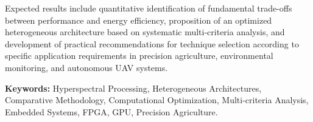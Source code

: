 Expected results include quantitative identification of fundamental trade-offs between performance and energy efficiency, proposition of an optimized heterogeneous architecture based on systematic multi-criteria analysis, and development of practical recommendations for technique selection according to specific application requirements in precision agriculture, environmental monitoring, and autonomous UAV systems.

\textbf{Keywords:} 
Hyperspectral Processing, Heterogeneous Architectures, Comparative Methodology, Computational Optimization, Multi-criteria Analysis, Embedded Systems, FPGA, GPU, Precision Agriculture.
